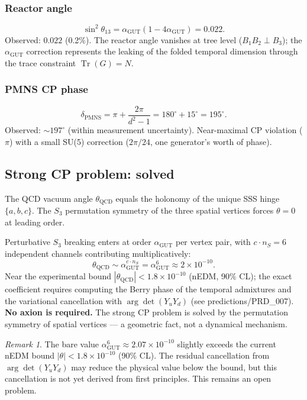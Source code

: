 \documentclass[12pt]{article}
\theoremstyle{remark}
\newtheorem{remark}[theorem]{Remark}
\theoremstyle{definition}
\newcommand{\tr}{\operatorname{Tr}}
\newcommand{\agut}{\alpha_{\mathrm{GUT}}}
\begin{document}
\subsubsection{Reactor angle}
\begin{equation}
\sin^2\theta_{13} = \agut(1 - 4\agut) = 0.022.
\end{equation}
Observed: $0.022$ (0.2\%). The reactor angle vanishes at tree level ($B_1 B_2 \perp B_3$); the $\agut$ correction represents the leaking of the folded temporal dimension through the trace constraint $\tr(G) = N$.

\subsubsection{PMNS CP phase}
\begin{equation}
\delta_\text{PMNS} = \pi + \frac{2\pi}{d^2 - 1} = 180^\circ + 15^\circ = 195^\circ.
\end{equation}
Observed: $\sim 197^\circ$ (within measurement uncertainty). Near-maximal CP violation ($\pi$) with a small SU(5) correction ($2\pi/24$, one generator's worth of phase).

\subsection{Strong CP problem: solved}

The QCD vacuum angle $\theta_\text{QCD}$ equals the holonomy of the unique SSS hinge $\{a, b, c\}$. The $S_3$ permutation symmetry of the three spatial vertices forces $\theta = 0$ at leading order.

Perturbative $S_3$ breaking enters at order $\alpha_\text{GUT}$ per vertex pair, with $c \cdot n_S = 6$ independent channels contributing multiplicatively:
\begin{equation}
\theta_\text{QCD} \sim \alpha_\text{GUT}^{c \cdot n_S} = \alpha_\text{GUT}^6 \approx 2 \times 10^{-10}.
\end{equation}
Near the experimental bound $|\theta_\text{QCD}| < 1.8 \times 10^{-10}$ (nEDM, 90\% CL); the exact coefficient requires computing the Berry phase of the temporal admixtures and the variational cancellation with $\arg\det(Y_u Y_d)$ (see predictions/PRD\_007).  \textbf{No axion is required.} The strong CP problem is solved by the permutation symmetry of spatial vertices --- a geometric fact, not a dynamical mechanism.

\begin{remark}
The bare value $\alpha_\text{GUT}^6 \approx 2.07 \times 10^{-10}$ slightly exceeds the current nEDM bound $|\theta| < 1.8 \times 10^{-10}$ (90\% CL). The residual cancellation from $\arg\det(Y_u Y_d)$ may reduce the physical value below the bound, but this cancellation is not yet derived from first principles. This remains an open problem.
\end{remark}
\end{document}
